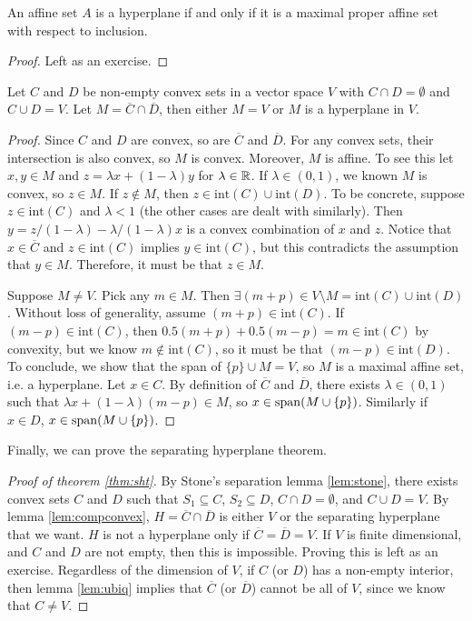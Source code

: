 \begin{lemma}
  An affine set $A$ is a hyperplane if and only if it is a maximal
  proper affine set with respect to inclusion.
\end{lemma}
\begin{proof}
  Left as an exercise.
\end{proof}
\begin{lemma}\label{lem:compconvex}
  Let $C$ and $D$ be non-empty convex sets in a vector space
  $V$ with $C \cap D = \emptyset$ and $C \cup D = V$. Let
  $M = \overline{C} \cap \overline{D}$, then either $M = V$ or $M$ is
  a hyperplane in $V$.
\end{lemma}
\begin{proof}
  Since $C$ and $D$ are convex, so are $\overline{C}$ and
  $\overline{D}$. For any convex sets, their intersection is also
  convex, so $M$ is convex. Moreover, $M$ is affine. To see this let
  $x,y \in M$ and $z = \lambda x + (1-\lambda) y $ for $\lambda \in
  \mathbb{R}$. If $\lambda \in (0,1)$, we known $M$ is convex, so $z \in
  M$. If $z \not\in M$, then $z \in \mathrm{int}(C) \cup
  \mathrm{int}(D)$. To be concrete, suppose $z \in \mathrm{int}(C)$ and $\lambda<1$
  (the other cases are dealt with similarly). Then $y = z/(1-\lambda)
  - \lambda/(1-\lambda) x$ is a convex combination of $x$ and
  $z$. Notice that $x \in \overline{C}$ and $z \in \mathrm{int}(C)$ implies
  $y \in \mathrm{int}(C)$, but this contradicts the assumption that $y
  \in M$. Therefore, it must be that $z \in M$. 

  Suppose $M \neq V$. Pick any $m \in M$. Then
  $\exists (m+p) \in V \setminus M = \mathrm{int}(C) \cup
  \mathrm{int}(D)$.
  Without loss of generality, assume $(m+p) \in \mathrm{int}(C)$.  If
  $(m-p) \in \mathrm{int}(C)$, then
  $0.5(m+p) + 0.5(m-p) = m \in \mathrm{int}(C)$ by convexity, but we
  know $m \not\in \mathrm{int}(C)$, so it must be that
  $(m-p) \in \mathrm{int}(D)$. To conclude, we show that the span of
  $\{p\} \cup M = V$, so $M$ is a maximal affine set, i.e. a
  hyperplane. Let $x \in C$. By definition of $\overline{C}$ and
  $\overline{D}$, there exists $\lambda \in (0,1)$ such that
  $\lambda x + (1-\lambda) (m-p) \in M$, so
  $x \in \mathrm{span}(M \cup \{p\})$. Similarly if $x \in D$,
  $x \in \mathrm{span}(M \cup \{p\})$.
\end{proof}
Finally, we can prove the separating hyperplane theorem.
\begin{proof}[Proof of theorem \ref{thm:sht}]
  By Stone's separation lemma \ref{lem:stone}, there exists convex
  sets $C$ and $D$ such that $S_1 \subseteq C$, $S_2 \subseteq D$,
  $C \cap D = \emptyset$, and $C \cup D = V$. By lemma
  \ref{lem:compconvex}, $H = \overline{C} \cap \overline{D}$ is either
  $V$ or the separating hyperplane that we want. $H$ is not a
  hyperplane only if $\overline{C} = \overline{D} = V$. If $V$ is
  finite dimensional, and $C$ and $D$ are not empty, then this is
  impossible. Proving this is left as an exercise. Regardless of the
  dimension of $V$, if $C$ (or $D$) has a non-empty interior, then
  lemma \ref{lem:ubiq} implies that $\overline{C}$ (or $\overline{D}$)
  cannot be all of $V$, since we know that $C \neq V$.
\end{proof}
